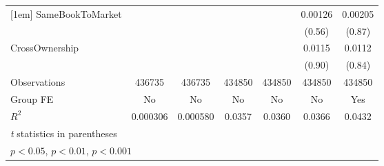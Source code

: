 {\begin{tabular}{l*{6}{c}}
[1em]
SameBookToMarket&                  &                  &                  &                  &  0.00126         &  0.00205         \\
                &                  &                  &                  &                  &   (0.56)         &   (0.87)         \\
[1em]
CrossOwnership  &                  &                  &                  &                  &   0.0115         &   0.0112         \\
                &                  &                  &                  &                  &   (0.90)         &   (0.84)         \\
\hline
Observations    &   436735         &   436735         &   434850         &   434850         &   434850         &   434850         \\
Group FE        &       No         &       No         &       No         &       No         &       No         &      Yes         \\
$ R^2 $         & 0.000306         & 0.000580         &   0.0357         &   0.0360         &   0.0366         &   0.0432         \\
\hline\hline
\multicolumn{7}{l}{\footnotesize \textit{t} statistics in parentheses}\\
\multicolumn{7}{l}{\footnotesize \sym{*} \(p<0.05\), \sym{**} \(p<0.01\), \sym{***} \(p<0.001\)}\\
\end{tabular}
}
